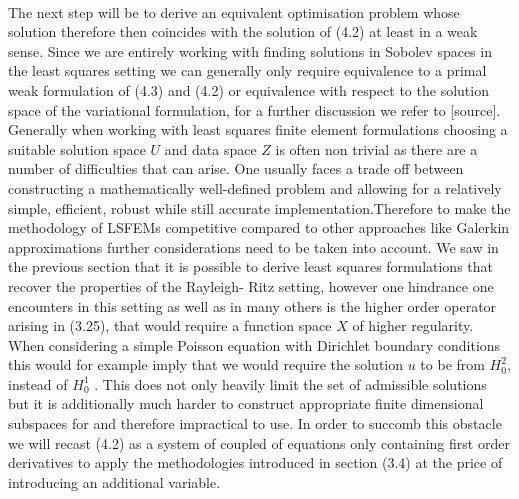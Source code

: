 \documentclass[../draft_1.tex]{subfiles}
\begin{document}
\smallskip
\\
The next step will be to derive an equivalent optimisation problem whose solution therefore then coincides with the solution of (4.2) at least in a weak sense. Since we are entirely working with finding solutions in Sobolev spaces in the least squares setting we can generally only require equivalence to a primal weak formulation of (4.3) and (4.2) or equivalence with respect to the solution space of the variational formulation, for a further discussion we refer to [source]. Generally when working with least squares finite element formulations choosing a suitable solution space $U$ and data space $Z$ is often non trivial as there are a number of difficulties that can arise. One usually faces a trade off between constructing a mathematically well-defined problem and allowing for a relatively simple, efficient, robust while still accurate implementation.Therefore to make the methodology of LSFEMs competitive compared to other approaches like Galerkin approximations further considerations need to be taken into account. We saw in the previous section that it is possible to derive least squares formulations that recover the properties of the Rayleigh- Ritz setting, however one hindrance one encounters in this setting as well as in many others is the higher order operator arising in (3.25), that would require a function space $X$ of higher regularity. When considering a simple Poisson equation with Dirichlet boundary conditions this would for example imply that we would require the solution $u$ to be from $H_0^2$, instead of $H_0^1$ \cite{bochev2009least}. This does not only heavily limit the set of admissible solutions but it is additionally much harder to construct appropriate finite dimensional subspaces for and therefore impractical to use. In order to succomb this obstacle we will recast (4.2) as a system of coupled of equations only containing first order derivatives to apply the methodologies introduced in section (3.4) at the price of introducing an additional variable.
\end{document}

